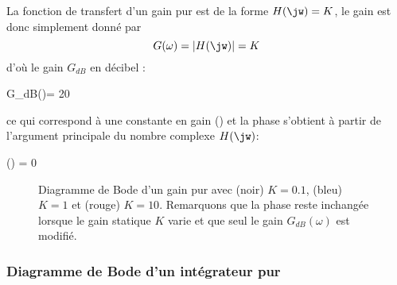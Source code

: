 La fonction de transfert d'un gain pur est de la forme $H(\jw)=K$,
le gain est donc simplement donné par 
$$
G(\omega)=|H(\jw)|=K
$$ 
d'où le gain $G_{dB}$ en décibel :
\begin{bequation}
G_{dB}(\omega)= 20
\end{bequation} ce qui correspond à une constante en gain 
() et la phase s'obtient à partir de l'argument 
principale du nombre complexe $H(\jw)$:
\begin{bequation}
\phi(\omega) = 0
\end{bequation}
\begin{figure}[!htb]
    \centering
    

    
    \caption{Diagramme de Bode d'un gain pur avec (noir) 
             $K=0.1$, (bleu) $K=1$ et (rouge) $K=10$. Remarquons que la 
             phase reste inchangée lorsque le gain statique $K$ varie et que 
             seul le gain $G_{dB}(\omega)$ est modifié. \label{fig-bode_gain}}
\end{figure}
\newpage


\subsubsection{Diagramme de Bode d'un intégrateur pur}


